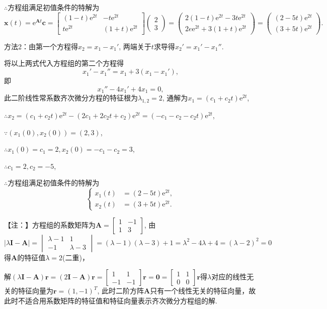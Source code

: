 \documentclass[12pt,UTF8]{ctexart}
\newcommand{\me}[0]{\mathrm e}
\begin{document}
\begin{enumerate}
$\therefore$方程组满足初值条件的特解为
\[\bm x(t)=\me^{\bm At}\bm c=\begin{bmatrix}(1-t)\me^{2t}&-t\me^{2t}\\t\me^{2t}&(1+t)\me^{2t}\end{bmatrix}\begin{pmatrix}2\\3\end{pmatrix}=\begin{pmatrix}2(1-t)\me^{2t}-3t\me^{2t}\\2e\me^{2t}+3(1+t)\me^{2t}\end{pmatrix}=\begin{pmatrix}(2-5t)\me^{2t}\\(3+5t)\me^{2t}\end{pmatrix}.\]

方法2：由第一个方程得$x_2=x_1-x_1'$, 两端关于$t$求导得$x_2'=x_1'-x_1''$.

将以上两式代入方程组的第二个方程得
\[x_1'-x_1''=x_1+3(x_1-x_1'),\]
即
\[x_1''-4x_1'+4x_1=0,\]
此二阶线性常系数齐次微分方程的特征根为$\lambda_{1,2}=2$, 通解为$x_1=(c_1+c_2t)\me^{2t}$,

$\therefore x_2=(c_1+c_2t)\me^{2t}-(2c_1+2c_2t+c_2)\me^{2t}=(-c_1-c_2-c_2t)\me^{2t}$,

$\because(x_1(0),x_2(0))=(2,3)$,

$\therefore x_1(0)=c_1=2,x_2(0)=-c_1-c_2=3$,

$\therefore c_1=2,c_2=-5$,

$\therefore$方程组满足初值条件的特解为
\[
\begin{cases}
x_1(t)&=(2-5t)\me^{2t},\\
x_2(t)&=(3+5t)\me^{2t}.
\end{cases}
\]

【注：】方程组的系数矩阵为$\bm A=\begin{bmatrix}1&-1\\1&3\end{bmatrix}$, 由$|\lambda\bm I-\bm A|=\begin{vmatrix}\lambda-1&1\\-1&\lambda-3\end{vmatrix}=(\lambda-1)(\lambda-3)+1=\lambda^2-4\lambda+4=(\lambda-2)^2=0$得$\bm A$的特征值$\lambda=2$(二重)，

解$(\lambda\bm I-\bm A)\bm r=(2\bm I-\bm A)\bm r=\begin{bmatrix}1&1\\-1&-1\end{bmatrix}\bm r=\bm0=\begin{bmatrix}1&1\\0&0\end{bmatrix}\bm r$得$\lambda$对应的线性无关的特征向量为$\bm r=(1,-1)^T$, 此时二阶方阵$\bm A$只有一个线性无关的特征向量，故此时不适合用系数矩阵的特征值和特征向量表示齐次微分方程组的解.


\end{enumerate}
\end{document}
